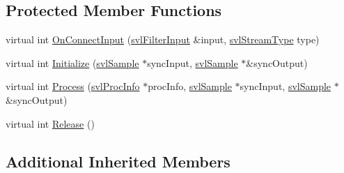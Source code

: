 \subsection*{Protected Member Functions}
\begin{DoxyCompactItemize}
\item 
virtual int \hyperlink{classsvl_filter_stereo_image_splitter_a2f4489ced16f3028756de85aa19a8639}{On\-Connect\-Input} (\hyperlink{classsvl_filter_input}{svl\-Filter\-Input} \&input, \hyperlink{svl_definitions_8h_aa00696d338a58db361335a01fd11e122}{svl\-Stream\-Type} type)
\item 
virtual int \hyperlink{classsvl_filter_stereo_image_splitter_aa816286392b847b1a3a5d8b5ef117986}{Initialize} (\hyperlink{classsvl_sample}{svl\-Sample} $\ast$sync\-Input, \hyperlink{classsvl_sample}{svl\-Sample} $\ast$\&sync\-Output)
\item 
virtual int \hyperlink{classsvl_filter_stereo_image_splitter_adcb522942c1988234734319723764124}{Process} (\hyperlink{structsvl_proc_info}{svl\-Proc\-Info} $\ast$proc\-Info, \hyperlink{classsvl_sample}{svl\-Sample} $\ast$sync\-Input, \hyperlink{classsvl_sample}{svl\-Sample} $\ast$\&sync\-Output)
\item 
virtual int \hyperlink{classsvl_filter_stereo_image_splitter_a54ad43ca63973e05a05e57062634f718}{Release} ()
\end{DoxyCompactItemize}
\subsection*{Additional Inherited Members}


